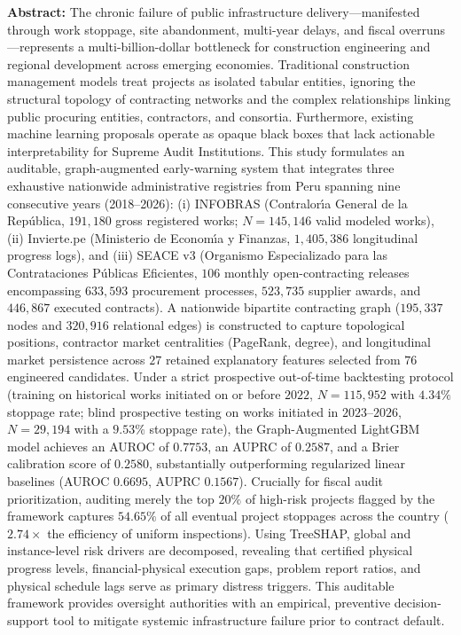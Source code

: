 \documentclass[10pt,a4paper]{article}
\begin{document}
\noindent\textbf{Abstract:} The chronic failure of public infrastructure delivery---manifested through work stoppage, site abandonment, multi-year delays, and fiscal overruns---represents a multi-billion-dollar bottleneck for construction engineering and regional development across emerging economies. Traditional construction management models treat projects as isolated tabular entities, ignoring the structural topology of contracting networks and the complex relationships linking public procuring entities, contractors, and consortia. Furthermore, existing machine learning proposals operate as opaque black boxes that lack actionable interpretability for Supreme Audit Institutions. This study formulates an auditable, graph-augmented early-warning system that integrates three exhaustive nationwide administrative registries from Peru spanning nine consecutive years (2018--2026): (i) INFOBRAS (Contralor{\'\i}a General de la Rep{\'u}blica, $191,180$ gross registered works; $N = 145,146$ valid modeled works), (ii) Invierte.pe (Ministerio de Econom{\'\i}a y Finanzas, $1,405,386$ longitudinal progress logs), and (iii) SEACE v3 (Organismo Especializado para las Contrataciones P{\'u}blicas Eficientes, $106$ monthly open-contracting releases encompassing $633,593$ procurement processes, $523,735$ supplier awards, and $446,867$ executed contracts). A nationwide bipartite contracting graph ($195,337$ nodes and $320,916$ relational edges) is constructed to capture topological positions, contractor market centralities (PageRank, degree), and longitudinal market persistence across $27$ retained explanatory features selected from $76$ engineered candidates. Under a strict prospective out-of-time backtesting protocol (training on historical works initiated on or before $2022$, $N = 115,952$ with $4.34\%$ stoppage rate; blind prospective testing on works initiated in $2023$--$2026$, $N = 29,194$ with a $9.53\%$ stoppage rate), the Graph-Augmented LightGBM model achieves an AUROC of $0.7753$, an AUPRC of $0.2587$, and a Brier calibration score of $0.2580$, substantially outperforming regularized linear baselines (AUROC $0.6695$, AUPRC $0.1567$). Crucially for fiscal audit prioritization, auditing merely the top $20\%$ of high-risk projects flagged by the framework captures $54.65\%$ of all eventual project stoppages across the country ($2.74\times$ the efficiency of uniform inspections). Using TreeSHAP, global and instance-level risk drivers are decomposed, revealing that certified physical progress levels, financial-physical execution gaps, problem report ratios, and physical schedule lags serve as primary distress triggers. This auditable framework provides oversight authorities with an empirical, preventive decision-support tool to mitigate systemic infrastructure failure prior to contract default.
\vspace{0.2cm}
\end{document}
